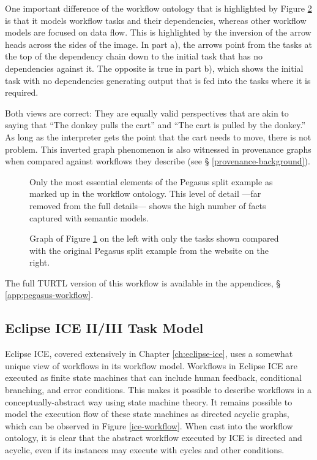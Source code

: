 One important difference of the workflow ontology that is highlighted by
Figure \ref{pegasus-comparison} is that it models workflow tasks and their
dependencies, whereas other workflow models are focused on data flow. This is
highlighted by the inversion of the arrow heads across the sides of the image.
In part a), the arrows point from the tasks at the top of the dependency chain
down to the initial task that has no dependencies against it. The opposite is
true in part b), which shows the initial task with no dependencies generating
output that is fed into the tasks where it is required. 

Both views are correct: They are equally valid perspectives that are akin
to saying that ``The donkey pulls the cart'' and ``The cart is pulled by the
donkey.'' As long as the interpreter gets the point that the cart needs to move,
there is not problem. This inverted graph phenomenon is also witnessed in
provenance graphs when compared against workflows they describe (see \S
\ref{provenance-background}).

\begin{figure}[htbp]
\centering
{}
\caption{Only the most essential elements of the Pegasus split
example as marked up in the workflow ontology. This level of detail ---far
removed from the full details--- shows the high number of facts captured with
semantic models.}
\label{pegasus-split-workflow}
\end{figure}

\begin{figure}[htbp]
\centering
{}
\caption{Graph of Figure \ref{pegasus-split-workflow} on the left with only
the tasks shown compared with the original Pegasus split example from the
website on the right.}
\label{pegasus-comparison}
\end{figure}

The full TURTL version of this workflow is available in the appendices, \S
\ref{app:pegasus-workflow}.

\subsection{Eclipse ICE II/III Task Model}

Eclipse ICE, covered extensively in Chapter \ref{ch:eclipse-ice},
uses a somewhat unique view of workflows in its workflow model. Workflows
in Eclipse ICE are executed as finite state machines that can include human
feedback, conditional branching, and error conditions. This makes it possible
to describe workflows in a conceptually-abstract way using state machine
theory. It remains possible to model the execution flow of these state machines
as directed acyclic graphs, which can be observed in Figure \ref{ice-workflow}.
When cast into the workflow ontology, it is clear that the abstract workflow
executed by ICE is directed and acyclic, even if its instances may execute with
cycles and other conditions.

